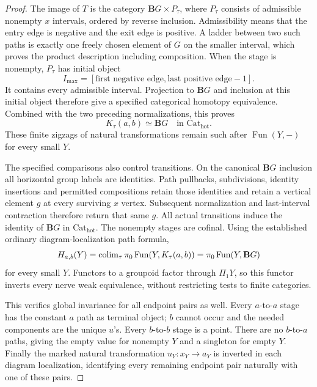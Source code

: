 \begin{proof}
The image of $T$ is the category $\mathbf BG\times P_\tau$, where
$P_\tau$ consists of admissible nonempty $x$ intervals, ordered by
reverse inclusion.  Admissibility means that the entry edge is
negative and the exit edge is positive.  A ladder between two such
paths is exactly one freely chosen element of $G$ on the smaller
interval, which proves the product description including composition.
When the stage is nonempty, $P_\tau$ has initial object
\[
 I_{\max}=[\text{first negative edge},
                 \text{last positive edge}-1].
\]
It contains every admissible interval.  Projection to $\mathbf BG$
and inclusion at this initial object therefore give a specified
categorical homotopy equivalence.  Combined with the two preceding
normalizations, this proves
\[
 K_\tau(a,b)\simeq\mathbf BG\quad\text{in }\mathrm{Cat}_{\mathrm{hot}}.
\]
These finite zigzags of natural transformations remain such after
$\operatorname{Fun}(Y,-)$ for every small $Y$.

The specified comparisons also control transitions.  On the canonical
$\mathbf BG$ inclusion all horizontal group labels are identities.
Path pullbacks, subdivisions, identity insertions and permitted
compositions retain those identities and retain a vertical element
$g$ at every surviving $x$ vertex.  Subsequent normalization and
last-interval contraction therefore return that same $g$.  All
actual transitions induce the identity of $\mathbf BG$ in
$\mathrm{Cat}_{\mathrm{hot}}$.  The nonempty stages are cofinal.
Using the established ordinary diagram-localization path formula,
\[
 H_{a,b}(Y)=\operatorname{colim}_\tau\pi_0\operatorname{Fun}(Y,K_\tau(a,b))
          =\pi_0\operatorname{Fun}(Y,\mathbf BG)
\]
for every small $Y$.  Functors to a groupoid factor through
$\Pi_1Y$, so this functor inverts every nerve weak equivalence,
without restricting tests to finite categories.

This verifies global invariance for all endpoint pairs as well.
Every $a$-to-$a$ stage has the constant $a$ path as terminal object;
$b$ cannot occur and the needed components are the unique $u$'s.
Every $b$-to-$b$ stage is a point.  There are no $b$-to-$a$ paths,
giving the empty value for nonempty $Y$ and a singleton for empty
$Y$.  Finally the marked natural transformation $u_Y:x_Y\to a_Y$
is inverted in each diagram localization, identifying every
remaining endpoint pair naturally with one of these pairs.


\end{proof}
